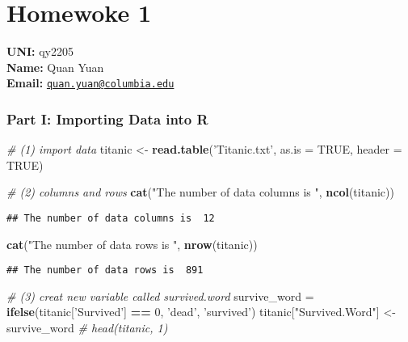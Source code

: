 \documentclass[]{article}
\title{}
\author{}
\date{}
\newenvironment{Shaded}{\begin{snugshade}}{\end{snugshade}}
\newcommand{\KeywordTok}[1]{\textcolor[rgb]{0.13,0.29,0.53}{\textbf{#1}}}
\newcommand{\DataTypeTok}[1]{\textcolor[rgb]{0.13,0.29,0.53}{#1}}
\newcommand{\DecValTok}[1]{\textcolor[rgb]{0.00,0.00,0.81}{#1}}
\newcommand{\StringTok}[1]{\textcolor[rgb]{0.31,0.60,0.02}{#1}}
\newcommand{\CommentTok}[1]{\textcolor[rgb]{0.56,0.35,0.01}{\textit{#1}}}
\newcommand{\OtherTok}[1]{\textcolor[rgb]{0.56,0.35,0.01}{#1}}
\newcommand{\OperatorTok}[1]{\textcolor[rgb]{0.81,0.36,0.00}{\textbf{#1}}}
\newcommand{\NormalTok}[1]{#1}
\begin{document}
\section{Homewoke 1}\label{homewoke-1}

\textbf{UNI:} qy2205\\
\textbf{Name:} Quan Yuan\\
\textbf{Email:}
\href{mailto:quan.yuan@columbia.edu}{\nolinkurl{quan.yuan@columbia.edu}}

\subsubsection{Part I: Importing Data into
R}\label{part-i-importing-data-into-r}

\begin{Shaded}
\begin{Highlighting}[]
\CommentTok{# (1) import data}
\NormalTok{titanic <-}\StringTok{ }\KeywordTok{read.table}\NormalTok{(}\StringTok{'Titanic.txt'}\NormalTok{, }\DataTypeTok{as.is =} \OtherTok{TRUE}\NormalTok{, }\DataTypeTok{header =} \OtherTok{TRUE}\NormalTok{)}

\CommentTok{# (2) columns and rows}
\KeywordTok{cat}\NormalTok{(}\StringTok{"The number of data columns is "}\NormalTok{, }\KeywordTok{ncol}\NormalTok{(titanic))}
\end{Highlighting}
\end{Shaded}

\begin{verbatim}
## The number of data columns is  12
\end{verbatim}

\begin{Shaded}
\begin{Highlighting}[]
\KeywordTok{cat}\NormalTok{(}\StringTok{"The number of data rows is "}\NormalTok{, }\KeywordTok{nrow}\NormalTok{(titanic))}
\end{Highlighting}
\end{Shaded}

\begin{verbatim}
## The number of data rows is  891
\end{verbatim}

\begin{Shaded}
\begin{Highlighting}[]
\CommentTok{# (3) creat new variable called survived.word}
\NormalTok{survive_word =}\StringTok{ }\KeywordTok{ifelse}\NormalTok{(titanic[}\StringTok{'Survived'}\NormalTok{] }\OperatorTok{==}\StringTok{ }\DecValTok{0}\NormalTok{, }\StringTok{'dead'}\NormalTok{, }\StringTok{'survived'}\NormalTok{)}
\NormalTok{titanic[}\StringTok{"Survived.Word"}\NormalTok{] <-}\StringTok{ }\NormalTok{survive_word}
\CommentTok{# head(titanic, 1)}
\end{Highlighting}
\end{Shaded}
\end{document}
